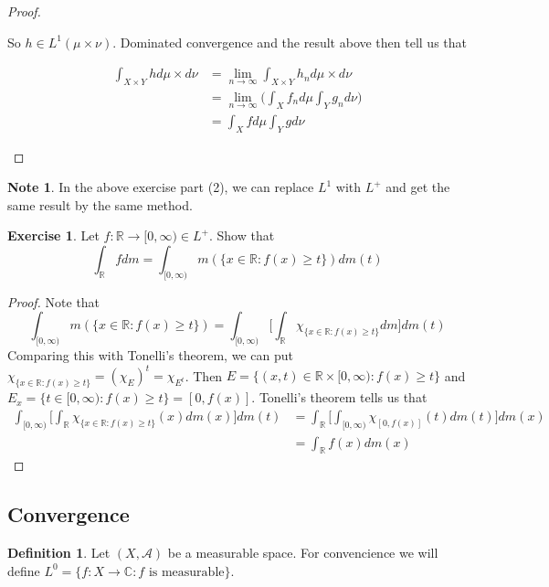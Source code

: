 \documentclass[12pt]{amsart}
\theoremstyle{definition}
\newtheorem{defn}[definition]{Definition}
\newtheorem{note}[definition]{Note}
\newtheorem{ex}[definition]{Exercise}
\newcommand{\C}{\mathbb{C}}
\newcommand{\R}{\mathbb{R}}
\newcommand{\MA}{\mathcal{A}}
\newcommand{\Rg}{[0,\infty)}
\newcommand{\limn}{\lim \limits_{n \rightarrow \infty}}
\begin{document}
\begin{proof}
\begin{enumerate}
			So $h \in L^1(\mu \times \nu)$. Dominated convergence and the result above then tell us that 
			
			\begin{align*}
				\int_{X \times Y} h d\mu \times d\nu 
				&= \limn \int_{X \times Y} h_n d\mu \times d\nu \\
				&= \limn \bigg( \int_X f_n d\mu \int_Y g_n d\nu \bigg)\\
				&= \int_X f d\mu \int_Y g d\nu
			\end{align*}
			
		\end{enumerate}
	\end{proof}
	
	\begin{note}
		In the above exercise part (2), we can replace $L^1$ with $L^+$ and get the same result by the same method.
	\end{note}
	
	\begin{ex}
		Let $f:\R \rightarrow \Rg \in L^+$. Show that $$\int_{\R}fdm = \int_{\Rg}m(\{x \in \R: f(x) \geq t\}) dm(t)$$
	\end{ex}
	
	\begin{proof}
		Note that $$\int_{\Rg}m(\{x \in \R: f(x) \geq t\}) = \int_{\Rg} \bigg[\int_{\R} \chi_{\{x \in \R: f(x) \geq t\}}dm \bigg]dm(t)$$
		Comparing this with Tonelli's theorem, we can put $\chi_{\{x \in \R: f(x) \geq t\}} = (\chi_{E})^t = \chi_{E^t}$. Then $E = \{(x,t) \in \R \times \Rg: f(x) \geq t\}$ and $E_x = \{t \in \Rg: f(x) \geq t\} = [0,f(x)]$. Tonelli's theorem tells us that 
		\begin{align*}
			\int_{\Rg} \bigg[\int_{\R} \chi_{\{x \in \R: f(x) \geq t\}}(x) dm(x) \bigg]dm(t)
			&= \int_{\R} \bigg[ \int_{\Rg} \chi_{[0,f(x)]}(t) dm(t) \bigg] dm(x)\\
			&= \int_{\R} f(x) dm(x)
		\end{align*} 
	\end{proof}
	
	\subsection{Convergence}
	
	\begin{defn}
		Let $(X, \MA)$ be a measurable space. For convencience we will define $L^0 = \{f:X \rightarrow \C: f \text{ is measurable}\}$.
	\end{defn}
	
\end{document}

